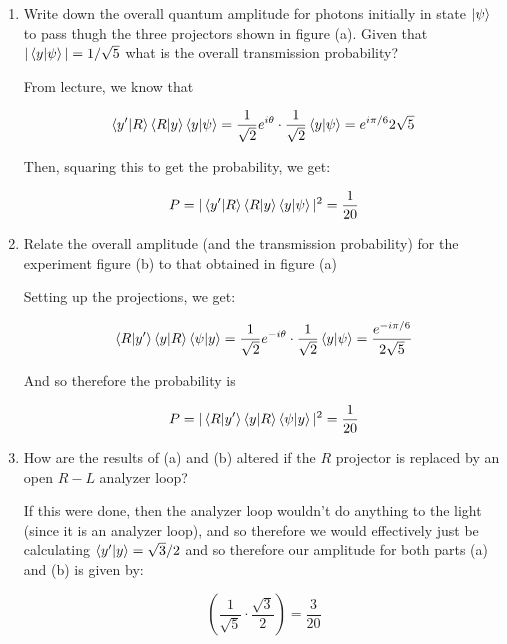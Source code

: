 \documentclass[10pt]{article}
\begin{document}
    \begin{enumerate}
        \item Write down the overall quantum amplitude for photons initially in state $\ket \psi$ to pass thugh the three projectors shown in figure (a). Given that $|\braket{y}{\psi}| = 1/\sqrt 5$ what is the overall transmission probability?
        
        \begin{solution}
            From lecture, we know that

            \[ \braket{y'}{R} \braket{R}{y} \braket{y}{\psi} = \frac{1}{\sqrt{2}}e^{i\theta} \cdot \frac{1}{\sqrt{2}} \braket{y}{\psi} = e^{i\pi/6}{2\sqrt{5}}\] 
            
            Then, squaring this to get the probability, we get: 
            
            \[ P = |\braket{y'}{R} \braket{R}{y} \braket{y}{\psi}|^2 = \frac{1}{20}\] 
        \end{solution}

        \item Relate the overall amplitude (and the transmission probability) for the experiment  figure (b) to that obtained in figure (a)
        
        \begin{solution}
            Setting up the projections, we get: 

            \[ \braket{R}{y'}\braket {y}{R}\braket {\psi}{y} = \frac{1}{\sqrt{2}}e^{-i\theta} \cdot \frac{1}{\sqrt{2}} \braket{y}{\psi} = \frac{e^{-i\pi/6}}{2\sqrt{5}}\] 

            And so therefore the probability is 

            \[ P = |\braket{R}{y'}\braket {y}{R} \braket {\psi}{y}|^2 = \frac{1}{20}\] 
        \end{solution}

        \item How are the results of (a) and (b) altered if the $R$ projector is replaced by an open $R-L$ analyzer loop? 
        
        \begin{solution}
            If this were done, then the analyzer loop wouldn't do anything to the light (since it is an analyzer loop), and so therefore we would effectively just be calculating $\braket{y'}{y} = \sqrt{3}/2$ and so therefore our amplitude for both parts (a) and (b) is given by: 

            \[ \left(\frac{1}{\sqrt{5}} \cdot \frac{\sqrt{3}}{2}\right) = \frac{3}{20}\] 
        \end{solution}
    \end{enumerate}
\end{document}
